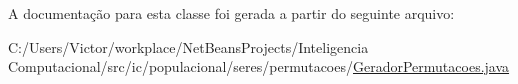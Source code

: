 A documentação para esta classe foi gerada a partir do seguinte arquivo\-:\begin{DoxyCompactItemize}
\item 
C\-:/\-Users/\-Victor/workplace/\-Net\-Beans\-Projects/\-Inteligencia Computacional/src/ic/populacional/seres/permutacoes/\hyperlink{_gerador_permutacoes_8java}{Gerador\-Permutacoes.\-java}\end{DoxyCompactItemize}
